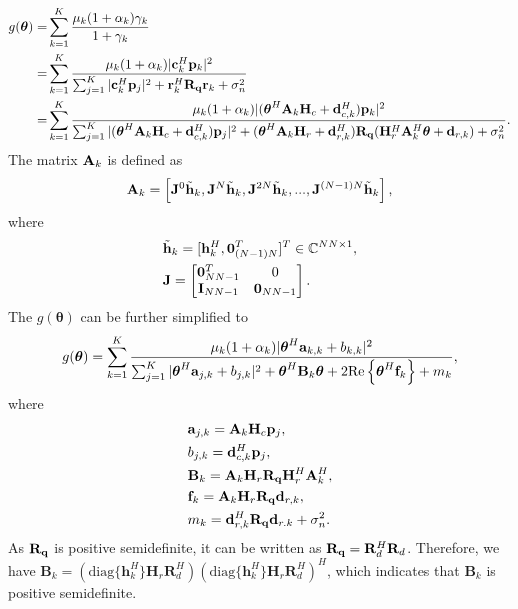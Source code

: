 \begin{align}
    g(\boldsymbol{\theta})
    =&\sum_{k=1}^K \frac{\mu_k(1+\alpha_k)\gamma_k}{1+\gamma_k} \nonumber\\ 
    =&\sum_{k=1}^K\frac{\mu_k(1+\alpha_k)|{\bf c}_{k}^H \mathbf{p}_k|^2} {\sum_{j=1}^{K} |{\bf c}_k^H \mathbf{p}_j|^2 + {\bf r}_k^H \mathbf{R}_{\bf q} {\bf r}_k + \sigma^2_n} \nonumber \\ 
    =&\sum_{k=1}^K\frac{\mu_k(1+\alpha_k)|({\boldsymbol \theta}^H {\bf A}_k \mathbf{H}_c + {\bf d}_{c,k}^H) \mathbf{p}_k|^2} {\sum_{j=1}^{K} |({\boldsymbol \theta}^H {\bf A}_k\mathbf{H}_c + {\bf d}_{c,k}^H) \mathbf{p}_j|^2 + ({\boldsymbol \theta}^H {\bf A}_k \mathbf{H}_r + {\bf d}_{r,k}^H) \mathbf{R}_{\bf q} (\mathbf{H}_r^H {\bf A}_k^H {\boldsymbol \theta}+ {\bf d}_{r,k}) + \sigma_n^2} .
\end{align}
The matrix ${\bf A}_k$ is defined as
\begin{equation}
    {\bf A}_k = \left[{\bf J}^0 \tilde{\bf h}_k,  {\bf J}^N \tilde{\bf h}_k,{\bf J}^{2 N} \tilde{\bf h}_k,...,{\bf J}^{(N-1) N} \tilde{\bf h}_k \right],
\end{equation}
where 
\begin{align}
    &\tilde{\bf h}_k = [ {\bf h}_k^H, {\bf 0}_{(N-1)N}^T]^T \in \mathbb{C}^{NN\times 1}, 
    \\ &{\bf J} = \left[ \begin{matrix} {\bf 0}_{NN-1}^T & 0 \\ {\bf I}_{NN-1} & {\bf 0}_{NN-1}\end{matrix} \right].
\end{align}
The $g(\boldsymbol{\theta})$ can be further simplified to
\begin{align}
    g(\boldsymbol{\theta}) = \sum_{k=1}^K \frac{\mu_k(1+\alpha_k) |\boldsymbol{\theta}^H {\bf a}_{k,k} + b_{k,k}|^2}{\sum_{j=1}^K |\boldsymbol{\theta}^H {\bf a}_{j,k} + b_{j,k}|^2 + \boldsymbol{\theta}^H {\bf B}_k \boldsymbol{\theta} +  2 \mathrm{Re} \left\{ \boldsymbol{\theta}^H {\bf f}_k \right\} + m_k},
\end{align}
where
\begin{align} 
    &\mathbf{a}_{j,k}={\bf A}_k \mathbf{H}_c \mathbf{p}_j, 
    \\ &b_{j,k} = {\bf d}_{c,k}^H {\bf p}_j, 
    \\ &\mathbf{B}_k={\bf A}_k\mathbf{H}_r \mathbf{R}_{\bf q} \mathbf{H}_r^H {\bf A}_k^H, 
    \\ &{\bf f}_k = {\bf A}_k {\bf H}_r {\bf R}_{\bf q} {\bf d}_{r,k}, 
    \\ &m_k = {\bf d}_{r,k}^H {\bf R}_{\bf q} {\bf d}_{r.k} + \sigma^2_n.
\end{align}
As $\mathbf{R}_{\bf q}$ is positive semidefinite, it can be written as $\mathbf{R}_{\bf q}=\mathbf{R}_d^H \mathbf{R}_d$.
Therefore, we have $\mathbf{B}_k=(\mathrm{diag}\{\mathbf{h}_k^H\} \mathbf{H}_r \mathbf{R}_d^H)(\mathrm{diag}\{\mathbf{h}_k^H\} \mathbf{H}_r \mathbf{R}_d^H)^H$,
which indicates that $\mathbf{B}_k$ is positive semidefinite.

